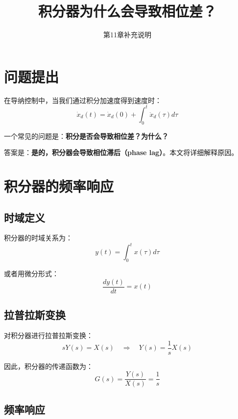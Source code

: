 \documentclass[12pt,a4paper]{article}
\title{积分器为什么会导致相位差？}
\author{第11章补充说明}
\date{}
\begin{document}
\maketitle

\section{问题提出}

在导纳控制中，当我们通过积分加速度得到速度时：
\begin{equation}
\dot{x}_d(t) = \dot{x}_d(0) + \int_0^t \ddot{x}_d(\tau) d\tau
\end{equation}

一个常见的问题是：\textbf{积分是否会导致相位差？为什么？}

答案是：\textbf{是的，积分器会导致相位滞后（phase lag）}。本文将详细解释原因。

\section{积分器的频率响应}

\subsection{时域定义}

积分器的时域关系为：
\begin{equation}
y(t) = \int_0^t x(\tau) d\tau
\end{equation}

或者用微分形式：
\begin{equation}
\frac{dy(t)}{dt} = x(t)
\end{equation}

\subsection{拉普拉斯变换}

对积分器进行拉普拉斯变换：
\begin{equation}
sY(s) = X(s) \quad \Rightarrow \quad Y(s) = \frac{1}{s}X(s)
\end{equation}

因此，积分器的传递函数为：
\begin{equation}
G(s) = \frac{Y(s)}{X(s)} = \frac{1}{s}
\end{equation}

\subsection{频率响应}
\end{document}
